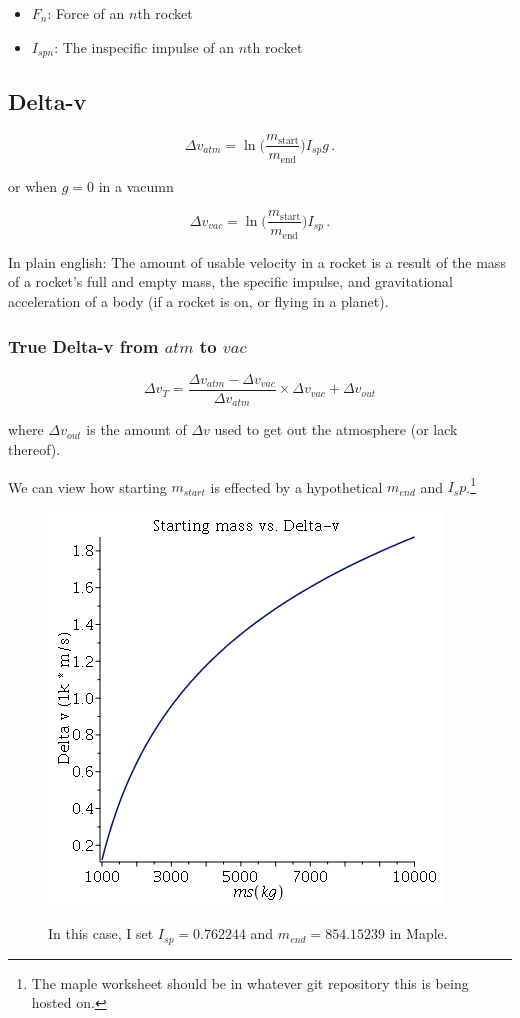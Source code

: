 \documentclass[12pt,a4paper]{article}
\numberwithin{equation}{section}
\begin{document}
\begin{itemize}
	\item $F_n$: Force of an $n$th rocket
	\item $I_{sp n}$: The inspecific impulse of an $n$th rocket
\end{itemize}

\subsection{Delta-v}

\begin{equation}
	\Delta v_{atm} = \ln \bigg( \frac{m_{\text{start}}}{m_{\text{end}}} \bigg) I_{sp} g \,.
\end{equation}

or when $g = 0$ in a vacumn

\begin{equation}
	\Delta v_{vac} = \ln \bigg( \frac{m_{\text{start}}}{m_{\text{end}}} \bigg) I_{sp} \,.
\end{equation}

In plain english: The amount of usable velocity in a rocket is a result of the mass of a rocket's full and empty mass, the specific impulse, and gravitational acceleration of a body (if a rocket is on, or flying in a planet).

\subsubsection{True Delta-v from $atm$ to $vac$}

\begin{equation}
	\Delta v_T = \frac{\Delta v_{atm} - \Delta v_{vac}}{\Delta v_{atm}} \times \Delta v_{vac} + \Delta v_{out}
\end{equation}

where $\Delta v_{out}$ is the amount of $\Delta v$ used to get out the atmosphere (or lack thereof).

We can view how starting $m_{start}$ is effected by a hypothetical $m_{end}$ and $I_sp$.\footnote{The maple worksheet should be in whatever git repository this is being hosted on.}

\begin{figure}[h]
	\centering
	\includegraphics[scale=0.5]{ms_vs_delta-v}
	\label{fig: 5}
	\caption{In this case, I set $I_{sp} = 0.762244$ and $m_{end} = 854.15239$ in Maple.}
\end{figure}
\end{document}

